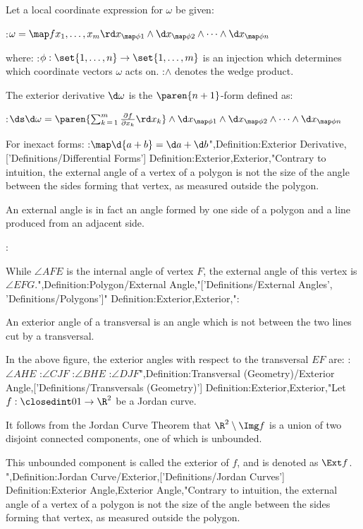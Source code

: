 Let a local coordinate expression for $\omega$ be given:

:$\omega = \map f {x_1, \ldots, x_m} \rd x_{\map \phi 1} \wedge \d x_{\map \phi 2} \wedge \cdots \wedge \d x_{\map \phi n}$

where:
:$\phi: \set {1, \ldots, n} \to \set {1, \ldots, m}$ is an injection which determines which coordinate vectors $\omega$ acts on.
:$\wedge$ denotes the wedge product.


The exterior derivative $\d \omega$ is the $\paren {n + 1}$-form defined as:

:$\ds \d \omega = \paren {\sum_{k \mathop = 1}^m \frac {\partial f} {\partial x_k} \rd x_k} \wedge \d x_{\map \phi 1} \wedge \d x_{\map \phi 2} \wedge \dots \wedge \d x_{\map \phi n}$


For inexact forms:
:$\map \d {a + b} = \d a + \d b$",Definition:Exterior Derivative,['Definitions/Differential Forms']
Definition:Exterior,Exterior,"Contrary to intuition, the external angle of a vertex of a polygon is not the size of the angle between the sides forming that vertex, as measured outside the polygon.

An external angle is in fact an angle formed by one side of a polygon and a line produced from an adjacent side.

:

While $\angle AFE$ is the internal angle of vertex $F$, the external angle of this vertex is $\angle EFG$.",Definition:Polygon/External Angle,"['Definitions/External Angles', 'Definitions/Polygons']"
Definition:Exterior,Exterior,":


An exterior angle of a transversal is an angle which is not between the two lines cut by a transversal.

In the above figure, the exterior angles with respect to the transversal $EF$ are:
:$\angle AHE$
:$\angle CJF$
:$\angle BHE$
:$\angle DJF$",Definition:Transversal (Geometry)/Exterior Angle,['Definitions/Transversals (Geometry)']
Definition:Exterior,Exterior,"Let $f: \closedint 0 1 \to \R^2$ be a Jordan curve.


It follows from the Jordan Curve Theorem that $\R^2 \setminus \Img f$ is a union of two disjoint connected components, one of which is unbounded.

This unbounded component is called the exterior of $f$, and is denoted as $\Ext f$.
",Definition:Jordan Curve/Exterior,['Definitions/Jordan Curves']
Definition:Exterior Angle,Exterior Angle,"Contrary to intuition, the external angle of a vertex of a polygon is not the size of the angle between the sides forming that vertex, as measured outside the polygon.

